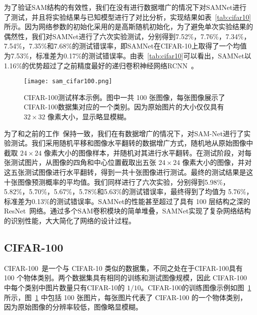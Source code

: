 为了验证SAM结构的有效性，我们在没有进行数据増广的情况下对SAMNet进行了测试，并且将实验结果与已知模型进行了对比分析，实现结果如表~\ref{tab:cifar10}所示。因为网络参数的初始化采用的是高斯随机初始化，为了避免单次实验结果的偶然性，我们对SAMNet进行了六次实验测试，分别得到7.52\%，7.76\%，7.34\%，7.54\%，7.35\%和7.68\%的测试错误率，即SAMNet在CIFAR-10上取得了一个均值为7.53\%，标准差为0.17\%的测试错误率。由表~\ref{tab:cifar10}可以看出，SAMNet以1.16\%的优势超过了之前精度最好的递归卷积神经网络RCNN~\cite{liang2015recurrent}。

\begin{figure}[!h]
\centering
\texttt{[image: sam\_cifar100.png]}
\caption{CIFAR-100测试样本示例。图中一共 100 张图像，每张图像展示了CIFAR-100数据集对应的一个类别。因为原始图片的大小仅仅具有$32\times32$ 像素大小，显示略显模糊。}
\label{fig:sam_cifar100}
\end{figure}


为了和之前的工作~\cite{goodfellow2013maxout,springenberg2013improving,stollenga2014deep,wan2013regularization,DBLP:journals/corr/LinCY13,lee2014deeply,liang2015recurrent,srivastava2015training,springenberg2014striving}保持一致，我们在有数据增广的情况下，对SAM-Net进行了实验测试。我们采用随机平移和图像水平翻转的数据增广方式，随机地从原始图像中截取 $24\times24$ 像素大小的图像样本，并随机对其进行水平翻转。在测试阶段，对每张测试图片，从图像的四角和中心位置截取出五张 $24\times24$ 像素大小的图像，并对这五张测试图像进行水平翻转，得到一共十张图像进行测试。最终的测试结果是这十张图像预测概率的平均值。我们同样进行了六次实验，分别得到5.98\%，5.82\%，5.70\%，5.67\%，5.78\%和5.63\%的测试错误率，最终得到了均值为 5.76\%，标准差为0.13\%的测试错误率。SAMNet的性能甚至超过了具有 100 层结构之深的ResNet~\cite{he2015deep}网络。通过多个SAM卷积模块的简单堆叠，SAMNet实现了复杂网络结构的识别性能，大大简化了网络的设计过程。



\subsection{CIFAR-100}
\label{sec:sap:experiment:cifar100}



CIFAR-100~\cite{krizhevsky2009learning}是一个与 CIFAR-10 类似的数据集，不同之处在于CIFAR-100具有 100 个物体类别。两个数据集具有相同的训练和测试图像规模，因此 CIFAR-100 中每个类别中图片数量只有CIFAR-10的 $1/10$。CIFAR-100的训练图像示例如图~\ref{fig:sam_cifar100} 所示，图~\ref{fig:sam_cifar100} 中包括 100 张图片，每张图片代表了 CIFAR-100 的一个物体类别，因为原始图像的分辨率较低，图像略显模糊。

